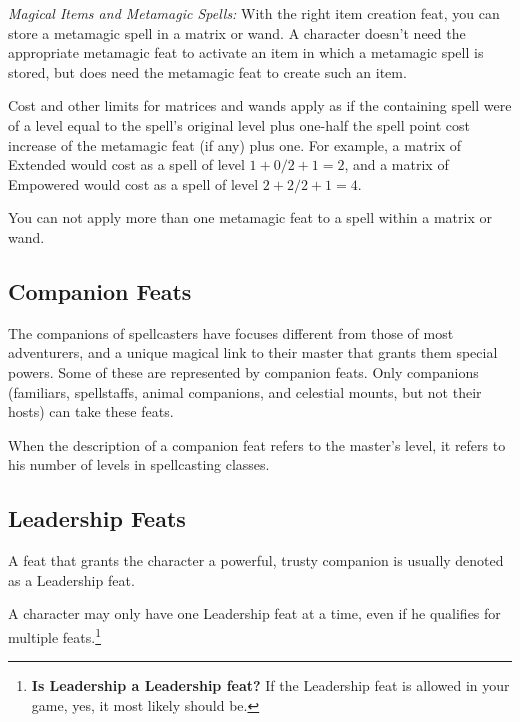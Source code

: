 \emph{Magical Items and Metamagic Spells:} With the right item creation feat, you can store a metamagic spell in a matrix or wand. 
A character doesn't need the appropriate metamagic feat to activate an item in which a metamagic spell is stored, but does need the metamagic feat to create such an item.

Cost and other limits for matrices and wands apply as if the containing spell were of a level equal to the spell's original level plus one-half the spell point cost increase of the metamagic feat (if any) plus one. For example, a matrix of Extended  would cost as a spell of level $1 + 0/2 + 1 = 2$, and a matrix of Empowered  would cost as a spell of level $2 + 2/2 + 1 = 4$.

You can not apply more than one metamagic feat to a spell within a matrix or wand.
\subsection{Companion Feats}
\label{sec:CompanionFeats}
The companions of spellcasters have focuses different from those of most adventurers, and a unique magical link to their master that grants them special powers.
Some of these are represented by companion feats. Only companions (familiars, spellstaffs, animal companions, and celestial mounts, but not their hosts) can take these feats.

When the description of a companion feat refers to the master's level, it refers to his number of levels in spellcasting classes.

\subsection{Leadership Feats}
\label{sec:LeadershipFeats}
A feat that grants the character a powerful, trusty companion is usually denoted as a Leadership feat.

A character may only have one Leadership feat at a time, even if he qualifies for multiple feats.\footnote{\textbf{Is Leadership a Leadership feat?} If the Leadership feat is allowed in your game, yes, it most likely should be.}